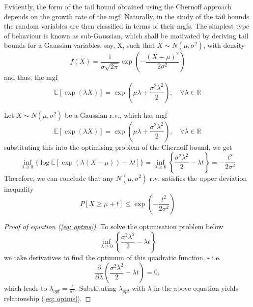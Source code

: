 \documentclass[10pt,handout,english]{beamer}
\newcommand{\E}{\mathbb{E}}
\newcommand{\R}{\mathbb{R}}
\begin{document}
\begin{frame}[allowframebreaks]
Evidently, the form of the tail bound obtained using the Chernoff approach depends on the growth rate of the mgf. Naturally, in the study of the tail bounds the random variables are then classified in terms of their mgfs. The simplest type of behaviour is known as sub-Gaussian, which shall be motivated by deriving tail bounds for a Gaussian variables, say, X, such that $X\sim N(\mu,\sigma^2)$, with density
\[
f(X)=\frac{1}{\sigma\sqrt{2\pi}}\exp\left(-\frac{(X-\mu)^2}{2\sigma^2}\right)
\]
and thus, the mgf
\[
\E[\exp(\lambda X)]=\exp\left(\mu\lambda+\frac{\sigma^2\lambda^2}{2}\right),\quad\forall\lambda\in\R
\]
\begin{example}
Let $X\sim N(\mu,\sigma^2)$ be a Gaussian r.v., which has mgf
\[
\E[\exp(\lambda X)]=\exp\left(\mu\lambda+\frac{\sigma^2\lambda^2}{2}\right),\quad \forall \lambda\in \R
\]
substituting this into the optimising problem of the Chernoff bound, we get
\begin{equation}\label{eq: optms}
\inf_{\lambda\geq 0}\{\log\E[\exp(\lambda(X-\mu))-\lambda t]\}=\inf_{\lambda\geq 0}\left\{\frac{\sigma^2\lambda^2}{2}-\lambda t\right\}=-\frac{t^2}{2\sigma^2}
\end{equation}
Therefore, we can conclude that any $N(\mu,\sigma^2)$ r.v. satisfies the upper deviation inequality
\begin{equation}\label{eq: Sub-Gaussian TB}
P[X\geq\mu+t]\leq\exp\left(-\frac{t^2}{2\sigma^2}\right)
\end{equation}
\end{example}
\end{frame}
\begin{frame}
\begin{proof}[Proof of equation (\ref{eq: optms})]
To solve the optimisation problem below 
\[
\inf_{\lambda\geq 0}\left\{\frac{\sigma^2\lambda^2}{2}-\lambda t\right\}
\]
we take derivatives to find the optimum of this quadratic function, - i.e.
\[
\frac{\partial}{\partial\lambda}\left(\frac{\sigma^2\lambda^2}{2}-\lambda t\right)=0,
\]
which leads to $\lambda_{opt}=\frac{t}{\sigma^2}$. Substituting $\lambda_{opt}$ with $\lambda$ in the above equation yields relationship (\ref{eq: optms}).
\end{proof}
\end{frame}
\end{document}
